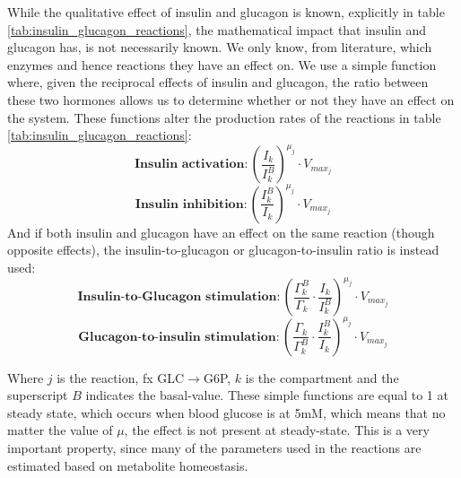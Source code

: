 \documentclass{IEEEtran}
\begin{document}

While the qualitative effect of insulin and glucagon is known, explicitly in table \ref{tab:insulin_glucagon_reactions}, the mathematical impact that insulin and glucagon has, is not necessarily known. We only know, from literature, which enzymes and hence reactions they have an effect on. We use a simple function where, given the reciprocal effects of insulin and glucagon, the ratio between these two hormones allows us to determine whether or not they have an effect on the system. These functions alter the production rates of the reactions in table \ref{tab:insulin_glucagon_reactions}:
\begin{equation}
    \textbf{Insulin activation}: \left(\frac{I_k}{I_k^B}\right)^{\mu_j}\cdot V_{max_j}
\end{equation}
\begin{equation}
    \textbf{Insulin inhibition}: \left(\frac{I_k^B}{I_k}\right)^{\mu_j}\cdot V_{max_j}
\end{equation}
And if both insulin and glucagon have an effect on the same reaction (though opposite effects), the insulin-to-glucagon or glucagon-to-insulin ratio is instead used:
\begin{equation}
    \textbf{Insulin-to-Glucagon stimulation}: \left(\frac{\Gamma_k^B}{\Gamma_k}\cdot \frac{I_k}{I_k^B}\right)^{\mu_j}\cdot V_{max_j}
\end{equation}
\begin{equation}
    \textbf{Glucagon-to-insulin stimulation}: \left(\frac{\Gamma_k}{\Gamma_k^B}\cdot \frac{I_k^B}{I_k}\right)^{\mu_j}\cdot V_{max_j}
\end{equation}

Where $j$ is the reaction, fx GLC$\rightarrow$G6P, $k$ is the compartment and the superscript $B$ indicates the basal-value. These simple functions are equal to 1 at steady state, which occurs when blood glucose is at 5mM, which means that no matter the value of $\mu$, the effect is not present at steady-state. This is a very important property, since many of the parameters used in the reactions are estimated based on metabolite homeostasis. \\
\end{document}
